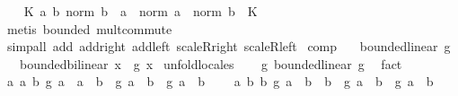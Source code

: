 \begin{isabellebody}
\ \ \isamarkupfalse%
\ {\isachardoublequoteopen}{\isasymexists}K{\isachardot}{\kern0pt}\ {\isasymforall}a\ b{\isachardot}{\kern0pt}\ norm\ {\isacharparenleft}{\kern0pt}b\ {\isacharasterisk}{\kern0pt}{\isacharasterisk}{\kern0pt}\ a{\isacharparenright}{\kern0pt}\ {\isasymle}\ norm\ a\ {\isacharasterisk}{\kern0pt}\ norm\ b\ {\isacharasterisk}{\kern0pt}\ K{\isachardoublequoteclose}\isanewline
\ \ \ \ \isamarkupfalse%
\ {\isacharparenleft}{\kern0pt}metis\ bounded\ mult{\isachardot}{\kern0pt}commute{\isacharparenright}{\kern0pt}\isanewline
{}\isamarkupfalse%
\ {\isacharparenleft}{\kern0pt}simp{\isacharunderscore}{\kern0pt}all\ add{\isacharcolon}{\kern0pt}\ add{\isacharunderscore}{\kern0pt}right\ add{\isacharunderscore}{\kern0pt}left\ scaleR{\isacharunderscore}{\kern0pt}right\ scaleR{\isacharunderscore}{\kern0pt}left{\isacharparenright}{\kern0pt}%
\endisatagproof
{\isafoldproof}%
%
\isadelimproof
\isanewline
%
\endisadelimproof
\isanewline
{}\isamarkupfalse%
\ comp{}{\isacharcolon}{\kern0pt}\isanewline
\ \ \ {\isachardoublequoteopen}bounded{\isacharunderscore}{\kern0pt}linear\ g{\isachardoublequoteclose}\isanewline
\ \ \ {\isachardoublequoteopen}bounded{\isacharunderscore}{\kern0pt}bilinear\ {\isacharparenleft}{\kern0pt}{\isasymlambda}x{\isachardot}{\kern0pt}\ {\isacharparenleft}{\kern0pt}{\isacharasterisk}{\kern0pt}{\isacharasterisk}{\kern0pt}{\isacharparenright}{\kern0pt}\ {\isacharparenleft}{\kern0pt}g\ x{\isacharparenright}{\kern0pt}{\isacharparenright}{\kern0pt}{\isachardoublequoteclose}\isanewline
%
\isadelimproof
%
\endisadelimproof
%
\isatagproof
{}\isamarkupfalse%
\ unfold{\isacharunderscore}{\kern0pt}locales\isanewline
\ \ \isamarkupfalse%
\ g{\isacharcolon}{\kern0pt}\ bounded{\isacharunderscore}{\kern0pt}linear\ g\ \isamarkupfalse%
\ fact\isanewline
\ \ \isamarkupfalse%
\ {\isachardoublequoteopen}{\isasymAnd}a\ a{\isacharprime}{\kern0pt}\ b{\isachardot}{\kern0pt}\ g\ {\isacharparenleft}{\kern0pt}a\ {\isacharplus}{\kern0pt}\ a{\isacharprime}{\kern0pt}{\isacharparenright}{\kern0pt}\ {\isacharasterisk}{\kern0pt}{\isacharasterisk}{\kern0pt}\ b\ {\isacharequal}{\kern0pt}\ g\ a\ {\isacharasterisk}{\kern0pt}{\isacharasterisk}{\kern0pt}\ b\ {\isacharplus}{\kern0pt}\ g\ a{\isacharprime}{\kern0pt}\ {\isacharasterisk}{\kern0pt}{\isacharasterisk}{\kern0pt}\ b{\isachardoublequoteclose}\isanewline
\ \ \ \ {\isachardoublequoteopen}{\isasymAnd}a\ b\ b{\isacharprime}{\kern0pt}{\isachardot}{\kern0pt}\ g\ a\ {\isacharasterisk}{\kern0pt}{\isacharasterisk}{\kern0pt}\ {\isacharparenleft}{\kern0pt}b\ {\isacharplus}{\kern0pt}\ b{\isacharprime}{\kern0pt}{\isacharparenright}{\kern0pt}\ {\isacharequal}{\kern0pt}\ g\ a\ {\isacharasterisk}{\kern0pt}{\isacharasterisk}{\kern0pt}\ b\ {\isacharplus}{\kern0pt}\ g\ a\ {\isacharasterisk}{\kern0pt}{\isacharasterisk}{\kern0pt}\ b{\isacharprime}{\kern0pt}{\isachardoublequoteclose}\isanewline

\end{isabellebody}
